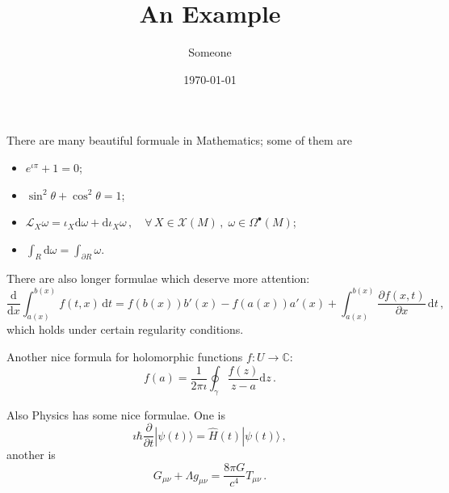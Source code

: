 \documentclass[a4paper]{article}
\title{An Example}
\author{Someone}
\date{\today}
\begin{document}
\maketitle

There are many beautiful formuale in Mathematics; some of them are
\begin{itemize}
    \item $e^{ιπ} + 1 = 0$;
    \item $\sin^2 θ + \cos^2 θ = 1$;
    \item $\mathcal{L}_X ω = ι_X\mathrm{d}ω + \mathrm{d}ι_X ω \,, \quad ∀\, X ∈ \mathcal{X}(M)\,,\; ω ∈ Ω^\bullet(M)$;
    \item $∫_R \mathrm{d}ω = ∫_{∂R} ω$.
\end{itemize}

There are also longer formulae which deserve more attention:
$$
\frac{\mathrm{d}}{\mathrm{d}x} ∫_{a(x)}^{b(x)} f(t, x)\, \mathrm{d}t = f(b(x))b'(x) - f(a(x))a'(x) + ∫_{a(x)}^{b(x)}\frac{∂ f(x, t)}{∂ x}\, \mathrm{d}t\,,
$$
which holds under certain regularity conditions.

Another nice formula  for holomorphic functions $f: U → \mathbb{C}$:
$$
f(a) = \frac{1}{2πı} ∮_γ \frac{f(z)}{z-a}\mathrm{d}z\,.
$$

Also Physics has some nice formulae. One is
$$
ıℏ\frac{∂}{∂t} |ψ(t)⟩ = \widehat{H}(t)|ψ(t)⟩ \,,
$$
another is
$$
G_{μν} + Λg_{μν} = \frac{8πG}{c^4}T_{μν}\,.
$$
\end{document}
